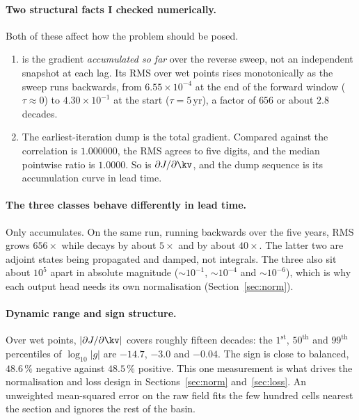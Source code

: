 \paragraph{Two structural facts I checked numerically.}
Both of these affect how the problem should be posed.

\begin{enumerate}
  \item {} is the gradient \emph{accumulated so far} over
        the reverse sweep, not an independent snapshot at each lag. Its RMS
        over wet points rises monotonically as the sweep runs backwards, from
        $6.55\times10^{-4}$ at the end of the forward window ($\tau\approx0$)
        to $4.30\times10^{-1}$ at the start ($\tau=5\,\mathrm{yr}$), a factor
        of $656$ or about $2.8$ decades.
  \item The earliest-iteration dump is the total gradient. Compared against
         the correlation is $1.000000$, the RMS agrees to
        five digits, and the median pointwise ratio is $1.0000$. So
         is $\partial J/\partial\kv$, and the dump sequence
        is its accumulation curve in lead time.
\end{enumerate}

\paragraph{The three classes behave differently in lead time.}
Only  accumulates. On the same run, running backwards over the
five years,  RMS grows $656\times$ while  decays
by about $5\times$ and  by about $40\times$. The latter two are
adjoint states being propagated and damped, not integrals. The three also sit
about $10^{5}$ apart in absolute magnitude ($\sim\!10^{-1}$, $\sim\!10^{-4}$
and $\sim\!10^{-6}$), which is why each output head needs its own
normalisation (Section~\ref{sec:norm}).

\paragraph{Dynamic range and sign structure.}
Over wet points, $|\partial J/\partial\kv|$ covers roughly fifteen decades: the
$1^{\text{st}}$, $50^{\text{th}}$ and $99^{\text{th}}$ percentiles of
$\log_{10}|g|$ are $-14.7$, $-3.0$ and $-0.04$. The sign is close to balanced,
$48.6\,\%$ negative against $48.5\,\%$ positive. This one measurement is what
drives the normalisation and loss design in Sections~\ref{sec:norm}
and~\ref{sec:loss}. An unweighted mean-squared error on the raw field fits the
few hundred cells nearest the section and ignores the rest of the basin.

